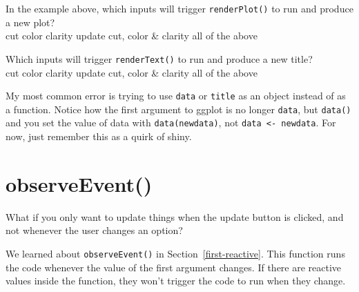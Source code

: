 \documentclass[
  oneside]{book}
\begin{document}
In the example above, which inputs will trigger \texttt{renderPlot}\texttt{()} to run and produce a new plot?\\
cut color clarity update cut, color \& clarity all of the above

Which inputs will trigger \texttt{renderText}\texttt{()} to run and produce a new title?\\
cut color clarity update cut, color \& clarity all of the above

\begin{warning}
My most common error is trying to use \texttt{data} or \texttt{title} as an object instead of as a function. Notice how the first argument to ggplot is no longer \texttt{data}, but \texttt{data}\texttt{()} and you set the value of data with \texttt{data(newdata)}, not \texttt{data\ \textless{}-\ newdata}. For now, just remember this as a quirk of shiny.

\end{warning}

\hypertarget{observeevent-1}{%
\section{observeEvent()}\label{observeevent-1}}

What if you only want to update things when the update button is clicked, and not whenever the user changes an option?

We learned about \texttt{observeEvent}\texttt{()} in Section~\ref{first-reactive}. This function runs the code whenever the value of the first argument changes. If there are reactive values inside the function, they won't trigger the code to run when they change.
\end{document}
